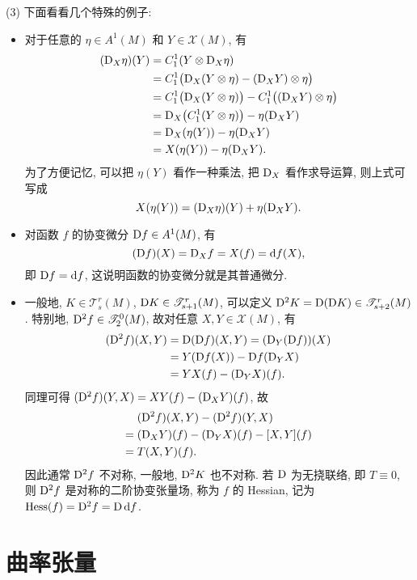 \begin{remark}
  (3) 下面看看几个特殊的例子:
  \begin{itemize}
    \item 对于任意的 $\eta\in A^1(M)$ 和 $Y\in\mathscr{X}(M)$, 有
      \begin{align*}
        (\mathrm{D}_X \eta)(Y)
        & = C_1^1(Y\otimes \mathrm{D}_X\eta) \\
        & = C_1^1\bigl(\mathrm{D}_X(Y\otimes\eta) - (\mathrm{D}_XY)\otimes\eta\bigr) \\
        & = C_1^1\bigl(\mathrm{D}_X(Y\otimes\eta)\bigr) - C_1^1\bigl((\mathrm{D}_XY)\otimes\eta\bigr) \\
        & = \mathrm{D}_X\bigl(C_1^1(Y\otimes\eta)\bigr) - \eta(\mathrm{D}_XY) \\
        & = \mathrm{D}_X(\eta(Y)) - \eta(\mathrm{D}_XY) \\
        & = X(\eta(Y)) - \eta(\mathrm{D}_XY).
      \end{align*}
      为了方便记忆, 可以把 $\eta(Y)$ 看作一种乘法, 把 $\mathrm{D}_X$ 看作求导运算, 则上式可写成
      \[X(\eta(Y)) = (\mathrm{D}_X\eta)(Y) + \eta(\mathrm{D}_XY).\]
    \item 对函数 $f$ 的协变微分 $\mathrm{D} f\in A^1(M)$, 有
      \[(\mathrm{D} f)(X) = \mathrm{D}_X f = X(f) = \mathop{}\!\mathrm{d} f(X),\]
      即 $\mathrm{D} f=\mathop{}\!\mathrm{d} f$, 这说明函数的协变微分就是其普通微分.
    \item 一般地, $K\in\mathscr{T}_s^r(M)$, $\mathrm{D} K\in\mathscr{T}_{s+1}^r(M)$,
      可以定义 $\mathrm{D}^2K=\mathrm{D}(\mathrm{D} K)\in\mathscr{T}_{s+2}^r(M)$. 特别地, $\mathrm{D}^2f\in\mathscr{T}_2^0(M)$,
      故对任意 $X,Y\in\mathscr{X}(M)$, 有
      \begin{align*}
        (\mathrm{D}^2f)(X,Y)
        & = \mathrm{D}(\mathrm{D} f)(X,Y) = (\mathrm{D}_Y(\mathrm{D} f))(X) \\
        & = Y(\mathrm{D} f(X)) - \mathrm{D} f(\mathrm{D}_YX) \\
        & = YX(f) - (\mathrm{D}_YX)(f).
      \end{align*}
      同理可得 $(\mathrm{D}^2f)(Y,X)=XY(f)-(\mathrm{D}_XY)(f)$, 故
      \begin{align*}
        & (\mathrm{D}^2f)(X,Y) - (\mathrm{D}^2f)(Y,X) \\
        ={} & (\mathrm{D}_XY)(f) - (\mathrm{D}_YX)(f) - [X,Y](f) \\
        ={} & T(X,Y)(f).
      \end{align*}
      因此通常 $\mathrm{D}^2f$ 不对称, 一般地, $\mathrm{D}^2K$ 也不对称.
      若 $\mathrm{D}$ 为无挠联络, 即 $T\equiv 0$, 则 $\mathrm{D}^2 f$ 是对称的二阶协变张量场,
      称为 $f$ 的 Hessian, 记为 $\operatorname{Hess}(f)=\mathrm{D}^2f=\mathrm{D}\mathop{}\!\mathrm{d} f$.
  \end{itemize}
\end{remark}



\section{曲率张量}



